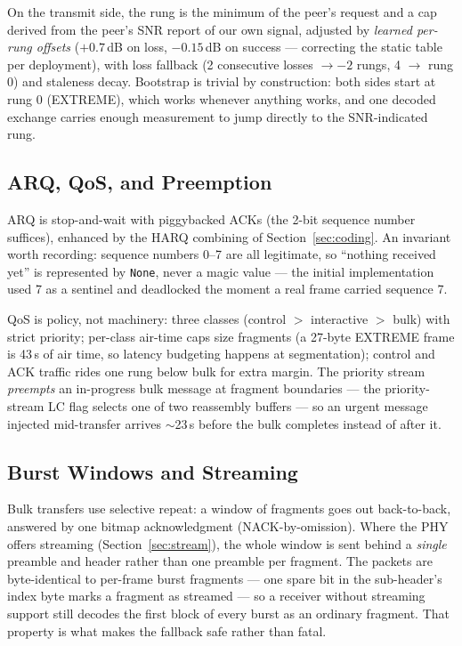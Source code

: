On the transmit side, the rung is the minimum of the peer's request
and a cap derived from the peer's SNR report of our own signal,
adjusted by \emph{learned per-rung offsets} ($+0.7$\,dB on loss,
$-0.15$\,dB on success --- correcting the static table per
deployment), with loss fallback (2 consecutive losses
$\rightarrow -2$ rungs, 4 $\rightarrow$ rung 0) and staleness decay.
Bootstrap is trivial by construction: both sides start at rung 0
(EXTREME), which works whenever anything works, and one decoded
exchange carries enough measurement to jump directly to the
SNR-indicated rung.

\subsection{ARQ, QoS, and Preemption}

ARQ is stop-and-wait with piggybacked ACKs (the 2-bit sequence number
suffices), enhanced by the HARQ combining of Section~\ref{sec:coding}.
An invariant worth recording: sequence numbers 0--7 are all
legitimate, so ``nothing received yet'' is represented by
\texttt{None}, never a magic value --- the initial implementation used
7 as a sentinel and deadlocked the moment a real frame carried
sequence 7.

QoS is policy, not machinery: three classes (control $>$ interactive
$>$ bulk) with strict priority; per-class air-time caps size fragments
(a 27-byte EXTREME frame is 43\,s of air time, so latency budgeting
happens at segmentation); control and ACK traffic rides one rung below
bulk for extra margin.  The priority stream \emph{preempts} an
in-progress bulk message at fragment boundaries --- the
priority-stream LC flag selects one of two reassembly buffers --- so
an urgent message injected mid-transfer arrives $\sim$23\,s before the
bulk completes instead of after it.

\subsection{Burst Windows and Streaming}
\label{sec:burstwin}

Bulk transfers use selective repeat: a window of fragments goes out
back-to-back, answered by one bitmap acknowledgment
(NACK-by-omission).  Where the PHY offers streaming
(Section~\ref{sec:stream}), the whole window is sent behind a
\emph{single} preamble and header rather than one preamble per
fragment.  The packets are byte-identical to per-frame burst fragments
--- one spare bit in the sub-header's index byte marks a fragment as
streamed --- so a receiver without streaming support still decodes the
first block of every burst as an ordinary fragment.  That property is
what makes the fallback safe rather than fatal.

